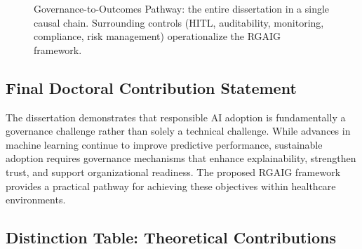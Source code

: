\begin{figure}[!htbp]
\centering
{}
\caption[Governance-to-Outcomes Pathway]{Governance-to-Outcomes Pathway: the entire dissertation in a single causal chain. Surrounding controls (HITL, auditability, monitoring, compliance, risk management) operationalize the RGAIG framework.}\label{fig:governance_pathway}
\end{figure}


\subsection{Final Doctoral Contribution Statement}
\label{sec:final_doctoral_contribution}

\noindent The dissertation demonstrates that responsible AI adoption is fundamentally a governance challenge rather than solely a technical challenge. While advances in machine learning continue to improve predictive performance, sustainable adoption requires governance mechanisms that enhance explainability, strengthen trust, and support organizational readiness. The proposed RGAIG framework provides a practical pathway for achieving these objectives within healthcare environments.




\subsection{Distinction Table: Theoretical Contributions}
\label{sec:distinction_theory_contribution}


